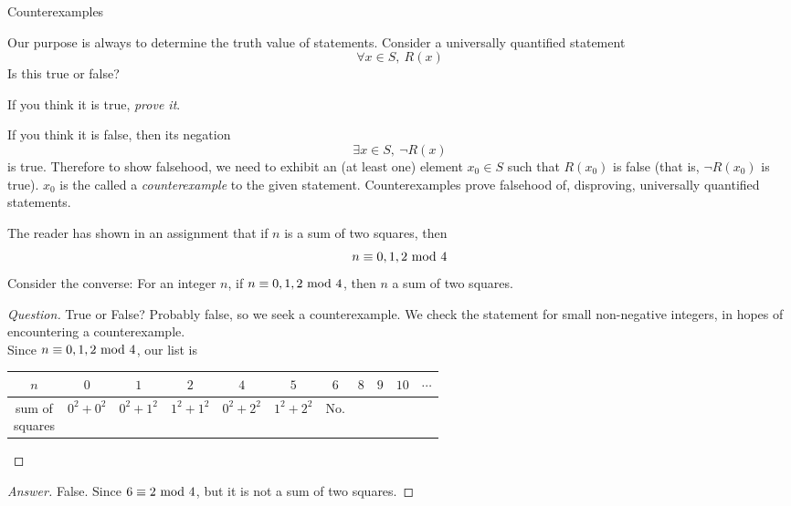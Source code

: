 \begin{mdframed}
\begin{center}
{\Large Counterexamples}
\end{center}
\end{mdframed}

\begin{discussion}
Our purpose is always to determine the truth value of statements. Consider a universally quantified statement 
\[\forall x\in S,\ R(x)\]
Is this true or false?
\item[] If you think it is true, \emph{prove it}.
\item[] If you think it is false, then its negation
\[\exists x \in S,\ \neg R(x)\]
is true. Therefore to show falsehood, we need to exhibit an (at least one) element $x_0 \in S$ such that $R(x_0)$ is false (that is, $\neg R(x_0)$ is true). $x_0$ is the called a \emph{counterexample} to the given statement. Counterexamples prove falsehood of, disproving, universally quantified statements.
\end{discussion}

\vspace*{1em}

\begin{example}
The reader has shown in an assignment that if $n$ is a sum of two squares, then
\[n \equiv 0,1,2 \text{ mod }{4}\]
Consider the converse: For an integer $n$, if $n \equiv 0,1,2 \text{ mod }{4}$, then $n$ a sum of two squares.
\end{example}
\begin{proof}[Question]
\renewcommand{\qed}{}
True or False? Probably false, so we seek a counterexample. We check the statement for small non-negative integers, in hopes of encountering a counterexample.\\[0.5em]
Since $n \equiv 0,1,2 \text{ mod }{4}$, our list is
\begin{center}
{\renewcommand{\arraystretch}{2}%
\begin{tabular}{c|cccccccccc}
$n$ & $0$ & $1$ & $2$ & $4$ & $5$ & $6$ & $8$ & $9$ & $10$ & $\cdots$\\
\hline
\makecell{sum of\\ squares} & $0^2 + 0^2$ & $0^2 + 1^2$ & $1^2 + 1^2$ & $0^2 + 2^2$ & $1^2 + 2^2$ & {\color{firebrick}No.} & \phantom{$1^2 +$} & \phantom{$1^2 +$} & \phantom{$1^2 +$} & 
\end{tabular}
}
\end{center}
\end{proof}
\begin{proof}[Answer]
False. Since $6 \equiv 2 \text{ mod }{4}$, but it is not a sum of two squares. 
\end{proof}

